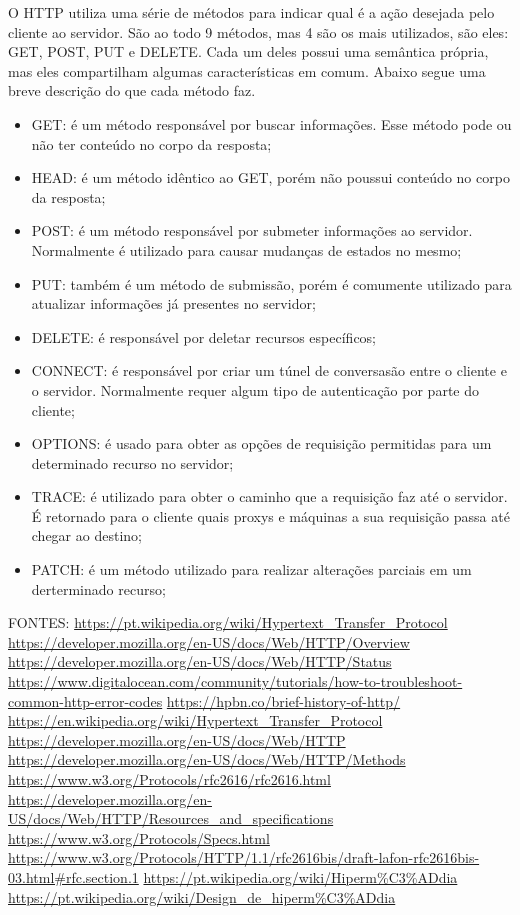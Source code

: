 O HTTP utiliza uma série de métodos para indicar qual é a ação desejada pelo cliente ao servidor. São ao todo 9 métodos, mas 4 são os mais utilizados, são eles: GET, POST, PUT e DELETE. Cada um deles possui uma semântica própria, mas eles compartilham algumas características em comum. Abaixo segue uma breve descrição do que cada método faz.
\begin{itemize}
\item GET: é um método responsável por buscar informações. Esse método pode ou não ter conteúdo no corpo da resposta;
\item HEAD: é um método idêntico ao GET, porém não poussui conteúdo no corpo da resposta;
\item POST: é um método responsável por submeter informações ao servidor. Normalmente é utilizado para causar mudanças de estados no mesmo;
\item PUT: também é um método de submissão, porém é comumente utilizado para atualizar informações já presentes no servidor;
\item DELETE: é responsável por deletar recursos específicos;
\item CONNECT: é responsável por criar um túnel de conversasão entre o cliente e o servidor. Normalmente requer algum tipo de autenticação por parte do cliente;
\item OPTIONS: é usado para obter as opções de requisição permitidas para um determinado recurso no servidor;
\item TRACE: é utilizado para obter o caminho que a requisição faz até o servidor. É retornado para o cliente quais proxys e máquinas a sua requisição passa até chegar ao destino;
\item PATCH: é um método utilizado para realizar alterações parciais em um derterminado recurso;
\end{itemize}


FONTES:
\url{https://pt.wikipedia.org/wiki/Hypertext_Transfer_Protocol}
\url{https://developer.mozilla.org/en-US/docs/Web/HTTP/Overview}
\url{https://developer.mozilla.org/en-US/docs/Web/HTTP/Status}
\url{https://www.digitalocean.com/community/tutorials/how-to-troubleshoot-common-http-error-codes}
\url{https://hpbn.co/brief-history-of-http/}
\url{https://en.wikipedia.org/wiki/Hypertext_Transfer_Protocol}
\url{https://developer.mozilla.org/en-US/docs/Web/HTTP}
\url{https://developer.mozilla.org/en-US/docs/Web/HTTP/Methods}
\url{https://www.w3.org/Protocols/rfc2616/rfc2616.html}
\url{https://developer.mozilla.org/en-US/docs/Web/HTTP/Resources_and_specifications}
\url{https://www.w3.org/Protocols/Specs.html}
\url{https://www.w3.org/Protocols/HTTP/1.1/rfc2616bis/draft-lafon-rfc2616bis-03.html#rfc.section.1}
\url{https://pt.wikipedia.org/wiki/Hiperm%C3%ADdia}
\url{https://pt.wikipedia.org/wiki/Design_de_hiperm%C3%ADdia}


